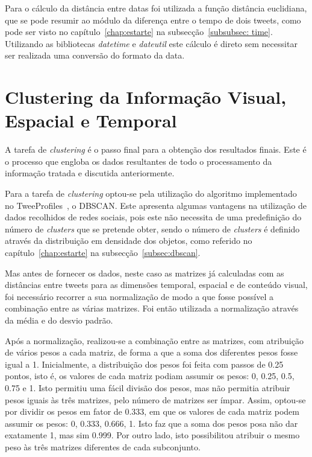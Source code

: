 Para o cálculo da distância entre datas foi utilizada a função distância euclidiana, que se pode resumir ao módulo da diferença entre o tempo de dois tweets, como pode ser visto no capítulo~\ref{chap:estarte} na subsecção~\ref{subsubsec: time}. Utilizando as bibliotecas \textit{datetime} e \textit{dateutil} este cálculo é direto sem necessitar ser realizada uma conversão do formato da data.


\section{Clustering da Informação Visual, Espacial e Temporal} \label{sec:finalclustering}

A tarefa de \textit{clustering} é o passo final para a obtenção dos resultados finais. Este é o processo que engloba os dados resultantes de todo o processamento da informação tratada e discutida anteriormente.

Para a tarefa de \textit{clustering} optou-se pela utilização do algoritmo implementado no TweeProfiles~\cite{Cunha2013}, o DBSCAN. Este apresenta algumas vantagens na utilização de dados recolhidos de redes sociais, pois este não necessita de uma predefinição do número de \textit{clusters} que se pretende obter, sendo o número de \textit{clusters} é definido através da distribuição em densidade dos objetos, como referido no capítulo~\ref{chap:estarte} na subsecção~\ref{subsec:dbscan}.

Mas antes de fornecer os dados, neste caso as matrizes já calculadas com as distâncias entre tweets para as dimensões temporal, espacial e de conteúdo visual, foi necessário recorrer a sua normalização de modo a que fosse possível a combinação entre as várias matrizes. Foi então utilizada a normalização através da média e do desvio padrão.

Após a normalização, realizou-se a combinação entre as matrizes, com atribuição de vários pesos a cada matriz, de forma a que a soma dos diferentes pesos fosse igual a 1. Inicialmente, a distribuição dos pesos foi feita com passos de 0.25 pontos, isto é, os valores de cada matriz podiam assumir os pesos: 0, 0.25, 0.5, 0.75 e 1. Isto permitiu uma fácil divisão dos pesos, mas não permitia atribuir pesos iguais às três matrizes, pelo número de matrizes ser ímpar. Assim, optou-se por dividir os pesos em fator de 0.333, em que os valores de cada matriz podem assumir os pesos: 0, 0.333, 0.666, 1. Isto faz que a soma dos pesos posa não dar exatamente 1, mas sim 0.999. Por outro lado, isto possibilitou atribuir o mesmo peso às três matrizes diferentes de cada subconjunto.

